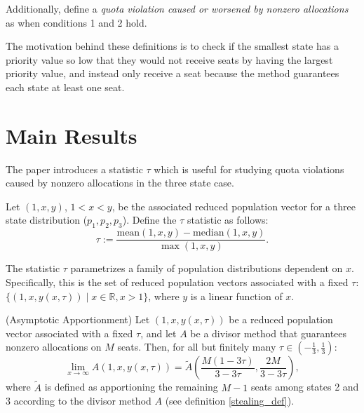 \documentclass[11pt]{article}
\theoremstyle{definition}
\theoremstyle{definition}
\newenvironment{customthm}[1]
  {\renewcommand\theinnercustomthm{#1}\innercustomthm}
  {\endinnercustomthm}
\newenvironment{customlemma}[1]
  {\renewcommand\theinnercustomlem{#1}\innercustomlem}
  {\endinnercustomlem}
\newenvironment{customdef}[1]
  {\renewcommand\theinnercustomdef{#1}\innercustomdef}
  {\endinnercustomdef}
\begin{document}
Additionally, define a \emph{quota violation caused or worsened by nonzero allocations} as when conditions 1 and 2 hold.

The motivation behind these definitions is to check if the smallest state has a priority value so low that they would not receive seats by having the largest priority value, and instead only receive a seat because the method guarantees each state at least one seat.

\section{Main Results}
The paper introduces a statistic $\tau$ which is useful for studying quota violations caused by nonzero allocations in the three state case.

\begin{customdef}{\ref{tau_def}}
    Let $(1,x,y)$, $1<x<y$, be the associated reduced population vector for a three state distribution ($p_1, p_2, p_3$). Define the $\tau$ statistic as follows: 
$$ \tau := \frac{\mathrm{mean}(1,x,y)-\mathrm{median}(1,x,y)}{\max(1,x,y)}. $$
\end{customdef}

\begin{customlemma}{\ref{tau_family}}
    The statistic $\tau$ parametrizes a family of population distributions dependent on $x$. Specifically, this is the set of reduced population vectors associated with a fixed $\tau$: $\{ (1,x,y(x,\tau)) \mid x \in \mathbb{R}, x>1 \}$, where $y$ is a linear function of $x$.
\end{customlemma}

\begin{customthm}{\ref{tau_limit_thm1}}
    (Asymptotic Apportionment) Let $(1,x,y(x,\tau))$ be a reduced population vector associated with a fixed $\tau$, and let $A$ be a divisor method that guarantees nonzero allocations on $M$ seats. Then, for all but finitely many $\tau \in (-\frac13,\frac13)$: $$\displaystyle{\lim_{x \to \infty} A(1,x,y(x,\tau)) = \tilde{A} \left( \frac{M(1-3\tau)}{3-3\tau},\frac{2M}{3-3\tau} \right)},$$ where $\tilde{A}$ is defined as apportioning the remaining $M-1$ seats among states 2 and 3 according to the divisor method $A$ (see definition \ref{stealing_def}).
\end{customthm}
\end{document}
